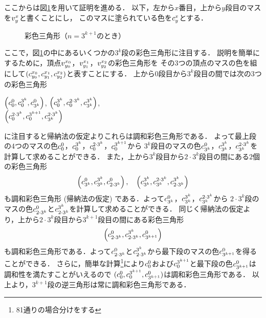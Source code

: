 \begin{itemize}
  ここからは図\ref{fig:ind_steps}を用いて証明を進める．
  以下，左から$x$番目，上から$y$段目のマスを$v^{x}_{y}$と書くことにし，
  このマスに塗られている色を$c^{x}_{y}$とする．  
\begin{figure}[h]
    \centering
    
    \caption{彩色三角形（$n=3^{k+1}$のとき）}
    \label{fig:ind_steps}
\end{figure}
ここで，図\ref{fig:ind_steps}の中にあるいくつかの$3^k$段の彩色三角形に注目する．
説明を簡単にするために，頂点$v^{x_0}_{y_0}$，$v^{x_1}_{y_1}$，$v^{x_2}_{y_2}$の彩色三角形を
その$3$つの頂点のマスの色を組にして$(c^{x_0}_{y_0},c^{x_1}_{y_1},c^{x_2}_{y_2})$と表すことにする．
上から$0$段目から$3^{k}$段目の間では次の$3$つの彩色三角形
\begin{center}
$\left(c^{0}_{0},c^{3^{k}}_{0},c^{0}_{3^{k}}\right)$,
\quad
$\left(c^{3^{k}}_{0},c^{2\cdot3^{k}}_{0},c^{3^{k}}_{3^{k}}\right)$,
\\
$\left(c^{2\cdot3^{k}}_{0},c^{3^{k+1}}_{0},c^{2\cdot3^{k}}_{3^{k}}\right)$
\end{center}
に注目すると帰納法の仮定よりこれらは調和彩色三角形である．
よって最上段の$4$つのマスの色$c^{0}_{0}$，$c^{3^k}_{0}$，$c^{2\cdot 3^k}_{0}$，$c^{3^{k+1}}_{0}$から
$3^k$段目のマスの色$c^{0}_{3^k}$，$c^{3^k}_{3^k}$，$c^{2\cdot 3^k}_{3^k}$を計算して求めることができる．
また，上から$3^{k}$段目から$2\cdot3^{k}$段目の間にある$2$個の彩色三角形
\[
\left(c^{0}_{3^{k}},c^{3^{k}}_{3^{k}},c^{0}_{2\cdot3^{k}}\right),
\quad
\left(c^{3^{k}}_{3^{k}},c^{2\cdot3^{k}}_{3^{k}},c^{3^{k}}_{2\cdot3^{k}}\right)
\]
も調和彩色三角形 (帰納法の仮定) である．よって$c^{0}_{3^k}$，$c^{3^k}_{3^k}$，$c^{2\cdot 3^k}_{3^k}$から
$2\cdot 3^k$段のマスの色$c^{0}_{2\cdot 3^k}$と$c^{3^k}_{2\cdot 3^k}$を計算して求めることができる．
同じく帰納法の仮定より，上から$2\cdot3^{k}$段目から$3^{k+1}$段目の間にある彩色三角形
\[
\left(c^{0}_{2\cdot3^{k}},c^{3^{k}}_{2\cdot3^{k}},c^{0}_{3^{k+1}}\right)
\]
も調和彩色三角形である．よって$c^{0}_{2\cdot 3^k}$と$c^{3^k}_{2\cdot 3^k}$から最下段のマスの色$c^{0}_{3^{k+1}}$を得ることができる．
さらに，簡単な計算\footnote{81通りの場合分けをする}により$c^{0}_{0}$および$c^{3^{k+1}}_{0}$と最下段の色$c^{0}_{3^{k+1}}$は調和性を満たすことがいえるので
$(c^{0}_{0},c^{3^{k+1}}_{0},c^{0}_{3^{k+1}})$は調和彩色三角形である．
以上より，$3^{k+1}$段の逆三角形は常に調和彩色三角形である．
\end{itemize}
